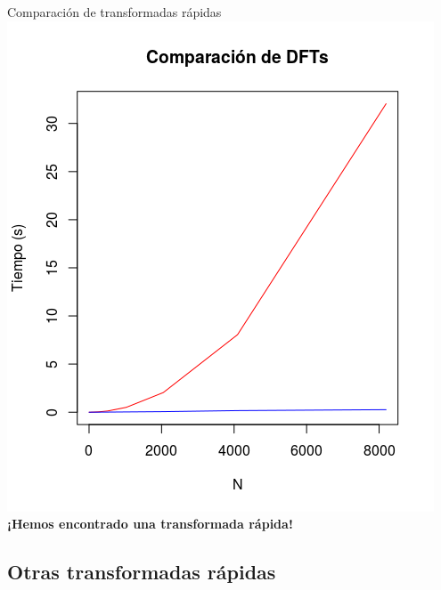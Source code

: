 \documentclass[11pt,compress]{beamer}
\begin{document}
\begin{frame}{Comparación de transformadas rápidas}
    \centering
    \includegraphics[height=6.5 cm]{./images/dft_comp.png}
    \textbf{¡Hemos encontrado una transformada rápida!}
\end{frame}

\subsection{Otras transformadas rápidas}
\end{document}
